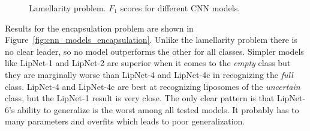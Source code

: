 \documentclass[a4paper, 11pt, table]{article}
\begin{document}
\begin{figure}[H]
\centering


\caption{\label{fig:cnn_models_lamellarity}Lamellarity problem. $F_1$ scores for different CNN models.}
\end{figure}

Results for the encapsulation problem are shown in Figure~\ref{fig:cnn_models_encapsulation}. Unlike the lamellarity problem there is no clear leader, so no model outperforms the other for all classes. Simpler models like LipNet-1 and LipNet-2 are superior when it comes to the \textit{empty} class but they are marginally worse than LipNet-4 and LipNet-4c in recognizing the \textit{full} class. LipNet-4 and LipNet-4c are best at recognizing liposomes of the \textit{uncertain} class, but the LipNet-1 result is very close. The only clear pattern is that LipNet-6's ability to generalize is the worst among all tested models. It probably has to many parameters and overfits which leads to poor generalization.
\end{document}
